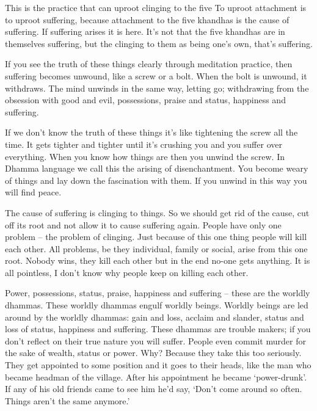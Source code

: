 This is the practice that can uproot clinging to the five  To uproot attachment is to uproot suffering, because attachment to the five khandhas is the cause of suffering. If suffering arises it is here. It's not that the five khandhas are in themselves suffering, but the clinging to them as being one's own, that's suffering. 

If you see the truth of these things clearly through meditation practice, then suffering becomes unwound, like a screw or a bolt. When the bolt is unwound, it withdraws. The mind unwinds in the same way, letting go; withdrawing from the obsession with good and evil, possessions, praise and status, happiness and suffering. 

If we don't know the truth of these things it's like tightening the screw all the time. It gets tighter and tighter until it's crushing you and you suffer over everything. When you know how things are then you unwind the screw. In Dhamma language we call this the arising of  disenchantment. You become weary of things and lay down the fascination with them. If you unwind in this way you will find peace. 

The cause of suffering is clinging to things. So we should get rid of the cause, cut off its root and not allow it to cause suffering again. People have only one problem -- the problem of clinging. Just because of this one thing people will kill each other. All problems, be they individual, family or social, arise from this one root. Nobody wins, they kill each other but in the end no-one gets anything. It is all pointless, I don't know why people keep on killing each other. 

Power, possessions, status, praise, happiness and suffering -- these are the worldly dhammas. These worldly dhammas engulf worldly beings. Worldly beings are led around by the worldly dhammas: gain and loss, acclaim and slander, status and loss of status, happiness and suffering. These dhammas are trouble makers; if you don't reflect on their true nature you will suffer. People even commit murder for the sake of wealth, status or power. Why? Because they take this too seriously. They get appointed to some position and it goes to their heads, like the man who became headman of the village. After his appointment he became `power-drunk'. If any of his old friends came to see him he'd say, `Don't come around so often. Things aren't the same anymore.'

